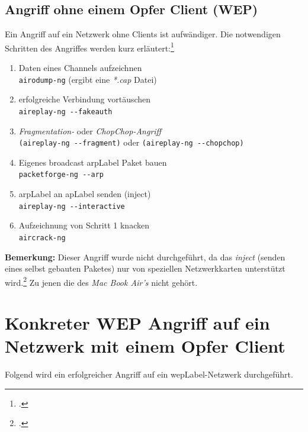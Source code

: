 \subsection{Angriff ohne einem Opfer Client (WEP)}
Ein Angriff auf ein Netzwerk ohne Clients ist aufwändiger.
Die notwendigen Schritten des Angriffes werden kurz erläutert:\footcite[][129f.]{WrightCache201503}
\begin{enumerate}
	\item Daten eines Channels aufzeichnen\\
	\texttt{airodump-ng} (ergibt eine \textit{*.cap} Datei)
	
	\item erfolgreiche Verbindung vortäuschen\\
	\texttt{aireplay-ng  -{}-fakeauth}
	
	\item \textit{Fragmentation-} oder \textit{ChopChop-Angriff}\\
	\texttt{(aireplay-ng -{}-fragment)} oder \texttt{(aireplay-ng -{}-chopchop)}
	
	\item Eigenes broadcast \gls{arpLabel} Paket bauen\\
	\texttt{packetforge-ng -{}-arp}
	
	\item \gls{arpLabel} an \gls{apLabel} senden (inject)\\
	\texttt{aireplay-ng -{}-interactive}
	
	\item Aufzeichnung von Schritt 1 knacken\\
	\texttt{aircrack-ng}
	
\end{enumerate}

\begin{framed}
	\textbf{Bemerkung:} Dieser Angriff wurde nicht durchgeführt, da das \textit{inject} (senden eines selbst gebauten Paketes) nur von speziellen Netzwerkkarten unterstützt wird.\footcite[][89f.]{WrightCache201503}
	Zu jenen die des \textit{Mac Book Air's} nicht gehört.
\end{framed}


\section{Konkreter WEP Angriff auf ein Netzwerk mit einem Opfer Client}
\label{sec:wepAttack}
Folgend wird ein erfolgreicher Angriff auf ein \gls{wepLabel}-Netzwerk durchgeführt.

